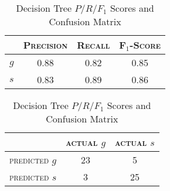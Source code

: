 \begin{table}[ht]
\begin{minipage}[b]{0.45\linewidth}\centering
\begin{tabular}{ c | c  c  c }
	& \textsc{Precision} & \textsc{Recall} & \textsc{F$_1$-Score} \\
	\hline
	\textsc{$g$} 	& 0.88 & 0.82 & 0.85 \\
	\textsc{$s$}	& 0.83 & 0.89 & 0.86
\end{tabular}
\end{minipage}
\hspace{0.5cm}
\begin{minipage}[b]{0.45\linewidth}
\centering
\begin{tabular}{ c | c  c }
	 & \textsc{actual $g$} & \textsc{actual $s$} \\
	\hline
	\textsc{predicted $g$} 	& 23 & 5 \\
	\textsc{predicted $s$}		& 3 & 25
\end{tabular}
\end{minipage}
\caption{Decision Tree $P/R/F_1$ Scores and Confusion Matrix}
\end{table}
